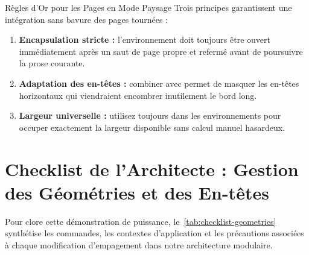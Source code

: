 \begin{landscape}
\begin{boiteSynthese}{Règles d'Or pour les Pages en Mode Paysage}
Trois principes garantissent une intégration sans bavure des pages tournées :
\begin{enumerate}
  \item \textbf{Encapsulation stricte :} l'environnement  doit toujours être ouvert
  immédiatement après un saut de page propre et refermé avant de poursuivre la prose courante.
  \item \textbf{Adaptation des en-têtes :} combiner  avec 
  permet de masquer les en-têtes horizontaux qui viendraient encombrer inutilement le bord long.
  \item \textbf{Largeur universelle :} utilisez toujours  dans les environnements 
  pour occuper exactement la largeur disponible sans calcul manuel hasardeux.
\end{enumerate}
\end{boiteSynthese}

\end{landscape}
\activerStyleStandard

\section{Checklist de l'Architecte : Gestion des Géométries et des En-têtes}
\label{sec:checklist-geometrie}

Pour clore cette démonstration de puissance, le~\cref{tab:checklist-geometries} synthétise
les commandes, les contextes d'application et les précautions associées
à chaque modification d'empagement dans notre architecture modulaire.

